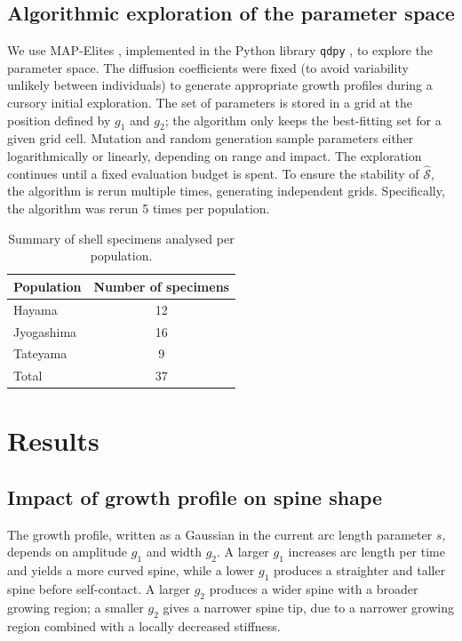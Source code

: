 \documentclass[11pt]{article}
\begin{document}
\subsection{Algorithmic exploration of the parameter space}
We use MAP-Elites \citep{ref40}, implemented in the Python library \texttt{qdpy} \citep{ref41}, to explore the parameter space. The diffusion coefficients were fixed (to avoid variability unlikely between individuals) to generate appropriate growth profiles during a cursory initial exploration. The set of parameters is stored in a grid at the position defined by $g_1$ and $g_2$; the algorithm only keeps the best-fitting set for a given grid cell. Mutation and random generation sample parameters either logarithmically or linearly, depending on range and impact. The exploration continues until a fixed evaluation budget is spent. To ensure the stability of $\hat{\mathcal{S}}$, the algorithm is rerun multiple times, generating independent grids. Specifically, the algorithm was rerun 5 times per population.

\begin{table}[htbp]
\centering
\caption{Summary of shell specimens analysed per population.}
\begin{tabular}{lc}
\toprule
Population & Number of specimens \\
\midrule
Hayama & 12 \\
Jyogashima & 16 \\
Tateyama & 9 \\
\midrule
Total & 37 \\
\bottomrule
\end{tabular}
\end{table}

\section{Results}
\subsection{Impact of growth profile on spine shape}
The growth profile, written as a Gaussian in the current arc length parameter $s$, depends on amplitude $g_1$ and width $g_2$. A larger $g_1$ increases arc length per time and yields a more curved spine, while a lower $g_1$ produces a straighter and taller spine before self-contact. A larger $g_2$ produces a wider spine with a broader growing region; a smaller $g_2$ gives a narrower spine tip, due to a narrower growing region combined with a locally decreased stiffness.
\end{document}
